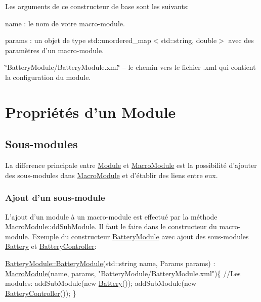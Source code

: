 Les arguments de ce constructeur de base sont les suivants\-:
\begin{DoxyEnumerate}
\item name \-: le nom de votre macro-\/module.
\item params \-: un objet de type {\ttfamily std\-::unordered\-\_\-map$<$std\-::string, double$>$} avec des paramètres d'un macro-\/module.
\item \char`\"{}\-Battery\-Module/\-Battery\-Module.\-xml\char`\"{} – le chemin vers le fichier {\ttfamily .xml} qui contient la configuration du module.
\end{DoxyEnumerate}\hypertarget{docModule_properties}{}\section{Propriétés d'un Module}\label{docModule_properties}
\hypertarget{docMacroModule_submodules}{}\subsection{Sous-\/modules}\label{docMacroModule_submodules}
La difference principale entre \hyperlink{classModule}{Module} et \hyperlink{classMacroModule}{Macro\-Module} est la possibilité d'ajouter des sous-\/modules dans \hyperlink{classMacroModule}{Macro\-Module} et d'établir des liens entre eux. \hypertarget{docMacroModule_addsubmodule}{}\subsubsection{Ajout d'un sous-\/module}\label{docMacroModule_addsubmodule}
L'ajout d'un module à un macro-\/module est effectué par la méthode Macro\-Module\-::dd\-Sub\-Module. Il faut le faire dans le constructeur du macro-\/module. Exemple du constructeur \hyperlink{classBatteryModule}{Battery\-Module} avec ajout des sous-\/modules \hyperlink{classBattery}{Battery} et \hyperlink{classBatteryController}{Battery\-Controller}\-: 
\begin{DoxyCode}
\hyperlink{classBatteryModule_a2fb494ef5f124c38c0fdf9ccfb31918f}{BatteryModule::BatteryModule}(std::string name, Params params) : 
      \hyperlink{classMacroModule}{MacroModule}(name, params, \textcolor{stringliteral}{"BatteryModule/BatteryModule.xml"})\{
    \textcolor{comment}{//Les modules:}
    addSubModule(\textcolor{keyword}{new} \hyperlink{classBattery}{Battery}());
    addSubModule(\textcolor{keyword}{new} \hyperlink{classBatteryController}{BatteryController}());        \}
\end{DoxyCode}
